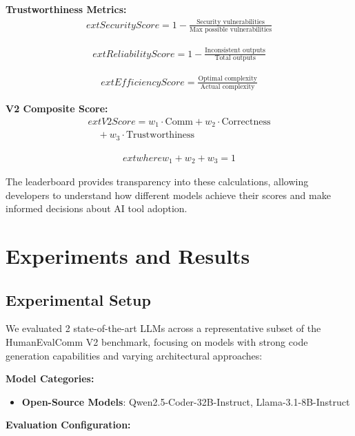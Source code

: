 \documentclass[conference]{IEEEtran}
\begin{document}
\textbf{Trustworthiness Metrics:}
\begin{align}
        ext{Security Score} = 1 - \frac{\text{Security vulnerabilities}}{\text{Max possible vulnerabilities}}
\end{align}

\begin{align}
        ext{Reliability Score} = 1 - \frac{\text{Inconsistent outputs}}{\text{Total outputs}}
\end{align}

\begin{align}
        ext{Efficiency Score} = \frac{\text{Optimal complexity}}{\text{Actual complexity}}
\end{align}

\textbf{V2 Composite Score:}
\begin{multline}
        ext{V2 Score} = w_1 \cdot \text{Comm} + w_2 \cdot \text{Correctness} \\
\quad + w_3 \cdot \text{Trustworthiness}
\end{multline}

\begin{align}
        ext{where } w_1 + w_2 + w_3 = 1
\end{align}

The leaderboard provides transparency into these calculations, allowing developers to understand how different models achieve their scores and make informed decisions about AI tool adoption.

\section{Experiments and Results}

\subsection{Experimental Setup}

We evaluated 2 state-of-the-art LLMs across a representative subset of the HumanEvalComm V2 benchmark, focusing on models with strong code generation capabilities and varying architectural approaches:

\textbf{Model Categories:}

\begin{itemize}
    \item \textbf{Open-Source Models}: Qwen2.5-Coder-32B-Instruct, Llama-3.1-8B-Instruct
\end{itemize}

\textbf{Evaluation Configuration:}
\end{document}
